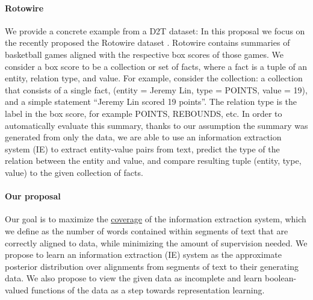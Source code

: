 \documentclass[11pt]{article}
\begin{document}
\paragraph{Rotowire}
\begin{comment}
\item Motivating extraction example
\item Transition towards more formal definitions so that we can define the tasks
\item TODO: Can maybe replace this whole section with a picture.
\end{comment}
We provide a concrete example from a D2T dataset:
In this proposal we focus on the recently proposed
the Rotowire dataset \citep{wiseman2017d2t}.
Rotowire contains summaries of basketball games aligned with the respective
box scores of those games.
We consider a box score to be a collection or set of facts,
where a fact is a tuple of an entity, relation type, and value.
For example, consider the collection:
a collection that consists of a single fact, (entity = Jeremy Lin, type = POINTS, value = 19),
and a simple statement ``Jeremy Lin scored 19 points''.
The relation type is the label in the box score, for example POINTS, REBOUNDS, etc.
In order to automatically evaluate this summary,
thanks to our assumption the summary was generated from only the data,
we are able to use an information extraction system (IE) to extract entity-value pairs
from text,
predict the type of the relation between the entity and value,
and compare resulting tuple (entity, type, value) to the given collection of facts.

\paragraph{Our proposal}
Our goal is to maximize the \underline{coverage} of the information extraction system,
which we define as the number of words contained within segments of text that are correctly aligned to data,
while minimizing the amount of supervision needed.
We propose to learn an information extraction (IE) system as the approximate posterior distribution over 
alignments from segments of text to their generating data.
We also propose to view the given data as incomplete
and learn boolean-valued functions of the data as a step
towards representation learning.
\end{document}
